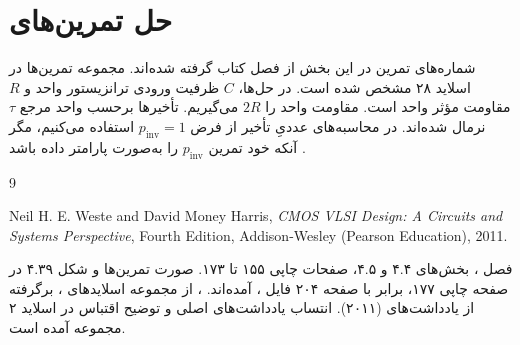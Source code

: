 \documentclass[12pt,a4paper]{article}
\newcommand{\secnum}[1]{\texorpdfstring{\mbox{\beginL#1\endL}}{#1}}
\begin{document}
\MakeAssignmentCover
\section{حل تمرین‌های }
\label{sec:delay-exercises}

شماره‌های تمرین در این بخش از فصل  کتاب گرفته شده‌اند.
مجموعه تمرین‌ها در اسلاید ۲۸ مشخص شده است. در حل‌ها، \(C\)
ظرفیت ورودی ترانزیستور واحد و \(R\) مقاومت مؤثر 
واحد است. مقاومت  واحد را \(2R\) می‌گیریم.
تأخیرها برحسب واحد مرجع \(\tau\) نرمال شده‌اند. در محاسبه‌های
عددیِ تأخیر  از فرض \(p_{\mathrm{inv}}=1\)
استفاده می‌کنیم، مگر آنکه خود تمرین \(p_{\mathrm{inv}}\) را
به‌صورت پارامتر داده باشد
\cite[تمرین‌های \secnum{۴.۵} تا \secnum{۴.۱۰}، صفحه ۱۷۷]{weste}
\cite[اسلاید ۲۸]{logicaleffortslides}.







\clearpage
\begin{thebibliography}{9}
\begin{latin}
Neil H. E. Weste and David Money Harris,
\textit{CMOS VLSI Design: A Circuits and Systems Perspective},
Fourth Edition, Addison-Wesley (Pearson Education), 2011.
\end{latin}
فصل ، بخش‌های \secnum{۴.۴} و \secnum{۴.۵}،
صفحات چاپی ۱۵۵ تا ۱۷۳. صورت تمرین‌ها و شکل \secnum{۴.۳۹}
در صفحه چاپی ۱۷۷، برابر با صفحه ۲۰۴ فایل ، آمده‌اند.
، از مجموعه اسلایدهای ،
برگرفته از یادداشت‌های  (۲۰۱۱).
انتساب یادداشت‌های اصلی و توضیح اقتباس در اسلاید ۲ مجموعه
 آمده است.
\end{thebibliography}
\end{document}
